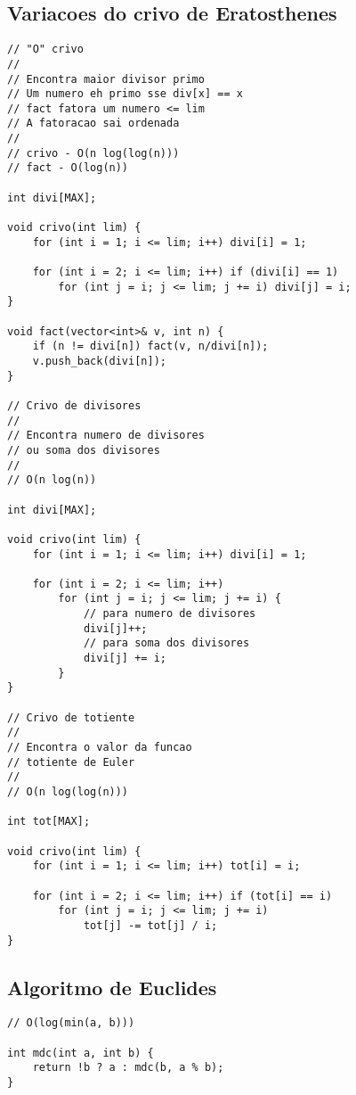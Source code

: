 \documentclass[12pt, a4paper, twoside]{article}
\begin{document}
\subsection{Variacoes do crivo de Eratosthenes}
\begin{lstlisting}
// "O" crivo
//
// Encontra maior divisor primo
// Um numero eh primo sse div[x] == x
// fact fatora um numero <= lim
// A fatoracao sai ordenada
//
// crivo - O(n log(log(n)))
// fact - O(log(n))

int divi[MAX];

void crivo(int lim) {
	for (int i = 1; i <= lim; i++) divi[i] = 1;

	for (int i = 2; i <= lim; i++) if (divi[i] == 1)
		for (int j = i; j <= lim; j += i) divi[j] = i;
}

void fact(vector<int>& v, int n) {
	if (n != divi[n]) fact(v, n/divi[n]);
	v.push_back(divi[n]);
}

// Crivo de divisores
//
// Encontra numero de divisores
// ou soma dos divisores
//
// O(n log(n))

int divi[MAX];

void crivo(int lim) {
	for (int i = 1; i <= lim; i++) divi[i] = 1;

	for (int i = 2; i <= lim; i++)
		for (int j = i; j <= lim; j += i) {
			// para numero de divisores
			divi[j]++;
			// para soma dos divisores
			divi[j] += i;
		}
}

// Crivo de totiente
//
// Encontra o valor da funcao
// totiente de Euler
//
// O(n log(log(n)))

int tot[MAX];

void crivo(int lim) {
	for (int i = 1; i <= lim; i++) tot[i] = i;

	for (int i = 2; i <= lim; i++) if (tot[i] == i)
		for (int j = i; j <= lim; j += i)
			tot[j] -= tot[j] / i;
}
\end{lstlisting}

\subsection{Algoritmo de Euclides}
\begin{lstlisting}
// O(log(min(a, b)))

int mdc(int a, int b) {
	return !b ? a : mdc(b, a % b);
}
\end{lstlisting}
\end{document}
